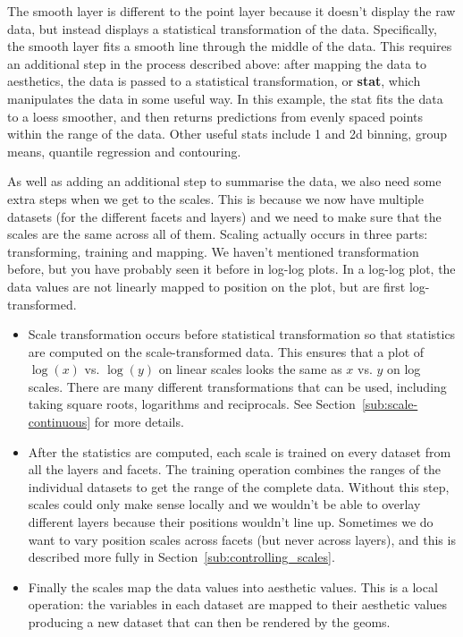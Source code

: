 The smooth layer is different to the point layer because it doesn't display the raw data, but instead displays a statistical transformation of the data.  Specifically, the smooth layer fits a smooth line through the middle of the data. This requires an additional step in the process described above: after mapping the data to aesthetics, the data is passed to a statistical transformation, or \textbf{stat}, which manipulates the data in some useful way. In this example, the stat fits the data to a loess smoother, and then returns predictions from evenly spaced points within the range of the data. Other useful stats include 1 and 2d binning, group means, quantile regression and contouring.

As well as adding an additional step to summarise the data, we also need some extra steps when we get to the scales. This is because we now have multiple datasets (for the different facets and layers) and we need to make sure that the scales are the same across all of them. Scaling actually occurs in three parts: transforming, training and mapping. We haven't mentioned transformation before, but you have probably seen it before in log-log plots. In a log-log plot, the data values are not linearly mapped to position on the plot, but are first log-transformed.

\begin{itemize}
  \item Scale transformation occurs before statistical transformation so that statistics are computed on the scale-transformed data.  This ensures that a plot of $\log(x)$ vs. $\log(y)$ on linear scales looks the same as $x$ vs. $y$ on log scales. There are many different transformations that can be used, including taking square roots, logarithms and reciprocals. See Section~\ref{sub:scale-continuous} for more details. 
  
  \item After the statistics are computed, each scale is trained on every dataset from all the layers and facets.  The training operation combines the ranges of the individual datasets to get the range of the complete data.  Without this step, scales could only make sense locally and we wouldn't be able to overlay different layers because their positions wouldn't line up.  Sometimes we do want to vary position scales across facets (but never across layers), and this is described more fully in Section~\ref{sub:controlling_scales}.
  
  \item Finally the scales map the data values into aesthetic values.  This is a local operation: the variables in each dataset are mapped to their aesthetic values producing a new dataset that can then be rendered by the geoms.
  
\end{itemize}

